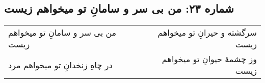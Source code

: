 \begin{center}
\section*{شماره ۲۳: من بی سر و سامانِ تو میخواهم زیست}
\label{sec:023}
\begin{longtable}{l p{0.5cm} r}
من بی سر و سامانِ تو میخواهم زیست
&&
سرگشته و حیرانِ تو میخواهم زیست
\\
در چاهِ زنخدانِ تو میخواهم مرد
&&
وز چشمهٔ حیوانِ تو میخواهم زیست
\\
\end{longtable}
\end{center}
